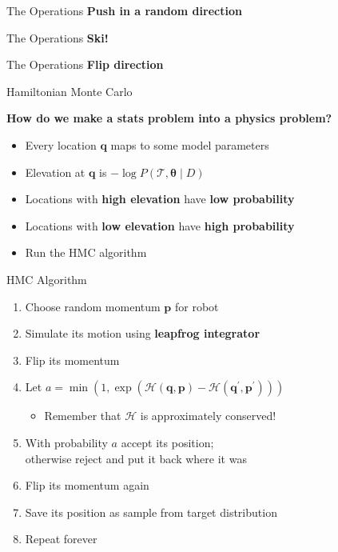 \documentclass{beamer}
\renewcommand{\vec}[1]{\ensuremath{\boldsymbol{\mathbf{#1}}}}
\begin{document}
\begin{frame}[t]{The Operations}
  \textbf{Push in a random direction}
\end{frame}

\begin{frame}[t]{The Operations}
  \textbf{Ski!}
\end{frame}

\begin{frame}[t]{The Operations}
  \textbf{Flip direction}
\end{frame}

\begin{frame}{Hamiltonian Monte Carlo}

  \textbf{How do we make a stats problem into a physics problem?}
  \pause
  \begin{itemize}
    \item Every location $\vec q$ maps to some model parameters \pause
    \item Elevation at $\vec q$ is $-\log{P\left(\mathcal{T}, \vec\theta \mid D\right)}$
    \item Locations with \textbf{high elevation} have \textbf{low probability}
    \item Locations with \textbf{low elevation} have \textbf{high probability} \pause
    \item Run the HMC algorithm
  \end{itemize}

\end{frame}

\begin{frame}{HMC Algorithm}

  \begin{enumerate}
    \item Choose random momentum $\vec{p}$ for robot
    \item Simulate its motion using \textbf{leapfrog integrator}
    \item Flip its momentum \pause
    \item Let $a = \min\left(1, \exp\left(\mathcal{H}\left(\vec{q}, \vec{p}\right) - \mathcal{H}\left(\vec{q}^\prime, \vec{p}^\prime\right)\right)\right)$
        \begin{itemize}
            \item Remember that $\mathcal{H}$ is approximately conserved!
        \end{itemize}
    \item With probability $a$ accept its position; \\ otherwise reject and put it back where it was \pause
    \item Flip its momentum again
    \item Save its position as sample from target distribution \pause
    \item Repeat forever
  \end{enumerate}

\end{frame}
\end{document}
